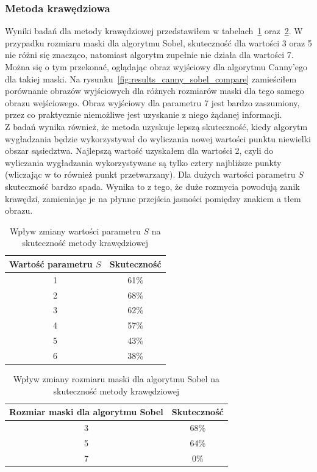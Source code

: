 \subsubsection{Metoda krawędziowa}
Wyniki badań dla metody krawędziowej przedstawiłem w tabelach~\ref{tab:metoda_krawedziowa_param_s} oraz~\ref{tab:metoda_krawedziowa_sobel}. W przypadku rozmiaru maski dla algorytmu Sobel, skuteczność dla wartości 3 oraz 5 nie różni się znacząco, natomiast algorytm zupełnie nie działa dla wartości 7. Można się o tym przekonać, oglądając obraz wyjściowy dla algorytmu Canny'ego dla takiej maski. Na rysunku~\ref{fig:results_canny_sobel_compare} zamieściłem porównanie obrazów wyjściowych dla różnych rozmiarów maski dla tego samego obrazu wejściowego. Obraz wyjściowy dla parametru 7 jest bardzo zaszumiony, przez co praktycznie niemożliwe jest uzyskanie z niego żądanej informacji.\\
Z badań wynika również, że metoda uzyskuje lepszą skuteczność, kiedy algorytm wygładzania będzie wykorzystywał do wyliczania nowej wartości punktu niewielki obszar sąsiedztwa. Najlepszą wartość uzyskałem dla wartości 2, czyli do wyliczania wygładzania wykorzystywane są tylko cztery najbliższe punkty (wliczając w to również punkt przetwarzany). Dla dużych wartości parametru $S$ skuteczność bardzo spada. Wynika to z tego, że duże rozmycia powodują zanik krawędzi, zamieniając je na płynne przejścia jasności pomiędzy znakiem a tłem obrazu.
\begin {table}[H]
  \begin{center}
    \begin{tabular}{c | c}
      Wartość parametru $S$ & Skuteczność \\
      \hline
      1 & 61\% \\
      2 & 68\% \\
      3 & 62\% \\
      4 & 57\% \\
      5 & 43\% \\
      6 & 38\% 
    \end{tabular}
    \caption {Wpływ zmiany wartości parametru $S$ na skuteczność metody krawędziowej}
    \label{tab:metoda_krawedziowa_param_s} 
  \end{center}
\end {table}

\begin {table}[H]
  \begin{center}
    \begin{tabular}{c | c}
      Rozmiar maski dla algorytmu Sobel & Skuteczność \\
      \hline
      3 & 68\% \\
      5 & 64\% \\
      7 & 0\% 
    \end{tabular}
    \caption {Wpływ zmiany rozmiaru maski dla algorytmu Sobel na skuteczność metody krawędziowej}
    \label{tab:metoda_krawedziowa_sobel} 
  \end{center}
\end {table}


